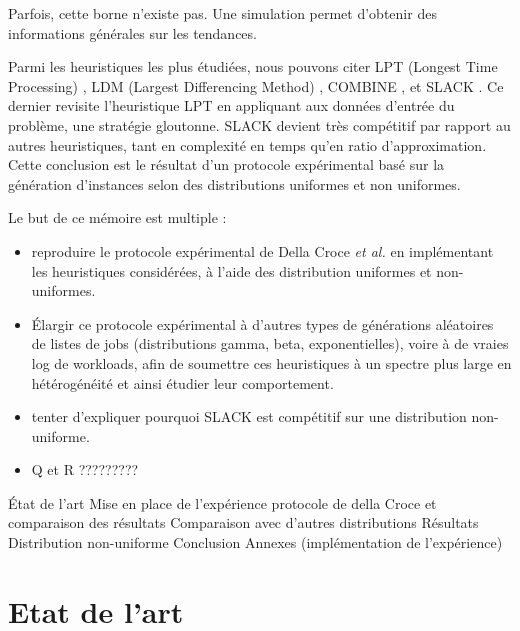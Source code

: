\documentclass[a4paper,12pt]{report}
\theoremstyle{plain}				%
\theoremstyle{definition}				%
\newcommand{\fco}[1]{\todo[author=FCO,color=teal,inline]{#1}}
\begin{document}
  Parfois, cette borne n'existe pas. Une simulation permet d'obtenir des 
  informations générales sur les tendances.

\bigskip
Parmi les heuristiques les plus étudiées, nous pouvons citer 
  LPT (Longest Time Processing) \cite{graham1966bounds}, 
  LDM (Largest Differencing Method) \cite{karmarkar1982differencing}, 
  COMBINE \cite{lee1988multiprocessor}, et 
  SLACK \cite{della2020longest}.
Ce dernier revisite l'heuristique LPT en appliquant aux données d'entrée du problème, 
  une stratégie gloutonne. 
SLACK devient très compétitif par rapport au autres heuristiques, 
  tant en complexité en temps 
  qu'en ratio d'approximation. 
Cette conclusion est le résultat d'un protocole expérimental 
  basé sur la génération d'instances selon des 
  distributions uniformes et non uniformes.  

Le but de ce mémoire est multiple :
\begin{itemize}
\item reproduire le protocole expérimental de Della Croce \emph{et al.} 
  en implémentant les heuristiques considérées, 
  à l'aide des distribution uniformes et non-uniformes.
\item Élargir ce protocole expérimental à 
  d'autres types de générations aléatoires 
  de listes de jobs (distributions gamma, beta, exponentielles), voire 
  à de vraies log de workloads, 
  afin de soumettre ces heuristiques à un spectre plus large en 
  hétérogénéité et ainsi étudier leur comportement.    
\item tenter d'expliquer pourquoi SLACK est 
  compétitif sur une distribution non-uniforme. 
\item Q et R ?????????
\end{itemize} 

\bigskip
\fco{...Plan une fois terminé...}
État de l'art
Mise en place de l'expérience
protocole de della Croce et comparaison des résultats
Comparaison avec d'autres distributions
Résultats
Distribution non-uniforme
Conclusion 
Annexes (implémentation de l'expérience)

\section{Etat de l'art} \label{sec:etatDeLArt}
\end{document}
